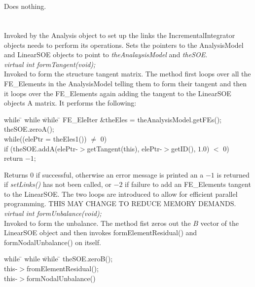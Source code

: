  \\
\\ 
Does nothing. \\

\\
 \\  
Invoked by the Analysis object to set up the links the
IncrementalIntegrator objects needs to perform its operations.
Sets the pointers to the AnalysisModel and LinearSOE objects to point
to {\em theAnalaysisModel} and {\em theSOE}. \\

{\em virtual int formTangent(void);} \\
Invoked to form the structure tangent matrix. The method first loops
over all the FE\_Elements in the AnalysisModel telling them to form
their tangent and then it loops over the FE\_Elements again adding the
tangent to the LinearSOE objects A matrix. It performs the following:
\begin{tabbing}
while \= \+ while \= while \= \kill
FE\_EleIter \&theEles = theAnalysisModel.getFEs();\\
theSOE.zeroA();\\
while((elePtr = theEles1()) $\neq$ 0) \+ \\
if (theSOE.addA(elePtr-$>$getTangent(this),
elePtr-$>$getID(), $1.0$) $<$ 0) \+ \\
return $-1$; \-\- 
\end{tabbing}
\noindent Returns $0$ if successful, otherwise an error
message is printed an a $-1$ is returned if {\em setLinks()} has not
been called, or $-2$ if failure to add an FE\_Elements tangent to the
LinearSOE. The two loops are introduced to allow for efficient
parallel programming. THIS MAY CHANGE TO REDUCE MEMORY DEMANDS.\\  

{\em virtual int formUnbalance(void);} \\
Invoked to form the unbalance. The method fist zeros out the $B$
vector of the LinearSOE object and then invokes formElementResidual()
and formNodalUnbalance() on itself. \\
\begin{tabbing}
while \= \+ while \= while \= \kill
theSOE.zeroB();\\
this-$>$fromElementResidual(); \\
this-$>$formNodalUnbalance() \\
\end{tabbing}

